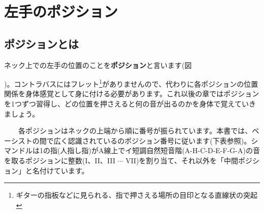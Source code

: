 \section{左手のポジション}
\subsection{ポジションとは}
ネック上での左手の位置のことを{\bf ポジション}と言います(図\addtocounter{figure}{1} \thefigure)。コントラバスにはフレット\footnote{ギターの指板などに見られる、指で押さえる場所の目印となる直線状の突起}がありませんので、代わりに各ポジションの位置関係を身体感覚として身に付ける必要があります。これ以後の章ではポジションを1つずつ習得し、どの位置を押さえると何の音が出るのかを身体で覚えていきましょう。\\

\begin{flushleft}
\begin{minipage}{280pt}
\ \ \ \ 各ポジションはネックの上端から順に番号が振られています。本書では、ベーシストの間で広く認識されている\cite{simandl}のポジション番号に従います(下表参照)。シマンドルは1の指(人指し指)がA線上でイ短調自然短音階(A-H-C-D-E-F-G-A)の音を取るポジションに整数(I、II、III \(\cdots\) VII)を割り当て、それ以外を「中間ポジション」と名付けています。\\


\end{minipage}
\end{flushleft}
